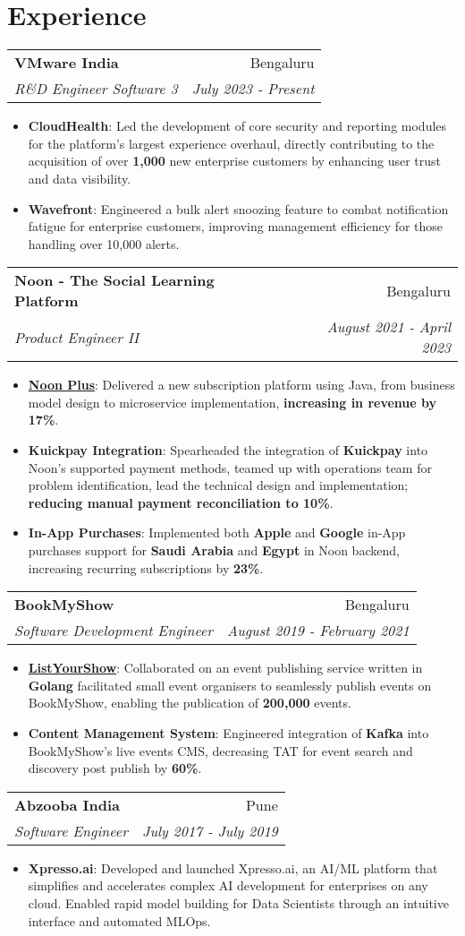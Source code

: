 \documentclass[letterpaper,11pt]{article}
\makeatletter
\newcommand{\resumeItem}[2]{
  \item\small{
    \textbf{#1}{: #2 \vspace{-2pt}}
  }
}
\newcommand{\resumeSubheading}[4]{
  \vspace{-1pt}\item
    \begin{tabular*}{0.97\textwidth}[t]{l@{\extracolsep{\fill}}r}
      \textbf{#1} & #2 \\
      \textit{\small#3} & \textit{\small #4} \\
    \end{tabular*}\vspace{-5pt}
}
\newcommand{\resumeSubHeadingListStart}{\begin{itemize}[leftmargin=*]}
\newcommand{\resumeItemListStart}{\begin{itemize}}
\newcommand{\resumeItemListEnd}{\end{itemize}\vspace{-5pt}}
\makeatother
\begin{document}
\section{Experience}
    \resumeSubheading
    {VMware India}{Bengaluru}
    {R\&D Engineer Software 3}{July 2023 - Present}
    \resumeItemListStart
    \resumeItem{CloudHealth}{Led the development of core security and reporting modules for the platform's largest experience overhaul, directly contributing to the acquisition of over \textbf{1,000} new enterprise customers by enhancing user trust and data visibility.}
    \resumeItem{Wavefront}
      {Engineered a bulk alert snoozing feature to combat notification fatigue for enterprise customers, improving management efficiency for those handling over 10,000 alerts.}
    \resumeItemListEnd
    \resumeSubheading
    {Noon - The Social Learning Platform}{Bengaluru}
    {Product Engineer II}{August 2021 - April 2023}
    \resumeItemListStart
    \resumeItem{\href{https://play.google.com/store/apps/details?id=com.noonEdu.k12App&hl=en&gl=US}{Noon Plus}}
      {Delivered a new subscription platform using Java, from business model design to microservice implementation, \textbf{increasing in revenue by 17\%}.}
    \resumeItem{Kuickpay Integration}
      {Spearheaded the integration of \textbf{Kuickpay} into Noon's supported payment methods, teamed up with operations team for problem identification, lead the technical design and implementation; \textbf{reducing manual payment reconciliation to 10\%}.}
    \resumeItem{In-App Purchases}
      {Implemented both \textbf{Apple} and \textbf{Google} in-App purchases support for \textbf{Saudi Arabia} and \textbf{Egypt} in Noon backend, increasing recurring subscriptions by \textbf{23\%}.}
    \resumeItemListEnd
    \resumeSubheading
      {BookMyShow}{Bengaluru}
      {Software Development Engineer}{August 2019 - February 2021}
      \resumeItemListStart
      \resumeItem{\href{https://in.bookmyshow.com/s/event-management/}{ListYourShow}}
        {Collaborated on an event publishing service written in \textbf{Golang} facilitated small event organisers to seamlessly publish events on BookMyShow, enabling the publication of \textbf{200,000} events.}
      \resumeItem{Content Management System}
        {Engineered integration of \textbf{Kafka} into BookMyShow's live events CMS, decreasing TAT for event search and discovery post publish by \textbf{60\%}.}
      \resumeItemListEnd
    \resumeSubheading
      {Abzooba India}{Pune}
      {Software Engineer}{July 2017 - July 2019}
      \resumeItemListStart
        \resumeItem{Xpresso.ai}
          {Developed and launched Xpresso.ai, an AI/ML platform that simplifies and accelerates complex AI development for enterprises on any cloud. Enabled rapid model building for Data Scientists through an intuitive interface and automated MLOps.}
      \resumeItemListEnd
\end{document}
